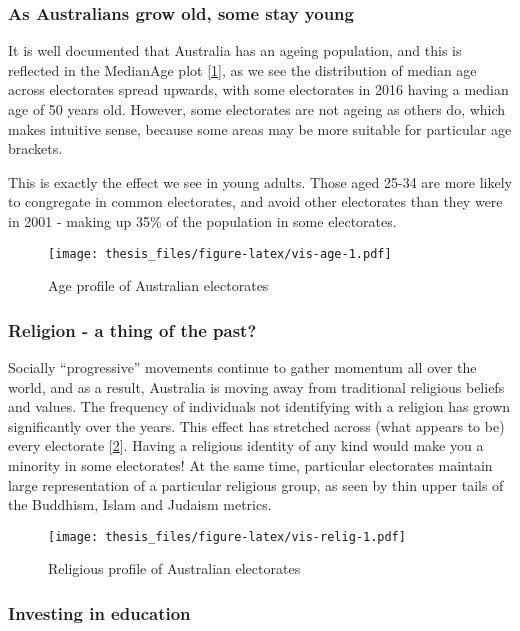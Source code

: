 \documentclass{monashthesis}
\theoremstyle{definition}
\theoremstyle{definition}
\theoremstyle{definition}
\theoremstyle{remark}
\begin{document}
\subsubsection{As Australians grow old, some stay
young}\label{as-australians-grow-old-some-stay-young}

It is well documented that Australia has an ageing population, and this
is reflected in the MedianAge plot {[}\ref{fig:vis-age}{]}, as we see
the distribution of median age across electorates spread upwards, with
some electorates in 2016 having a median age of 50 years old. However,
some electorates are not ageing as others do, which makes intuitive
sense, because some areas may be more suitable for particular age
brackets.

This is exactly the effect we see in young adults. Those aged 25-34 are
more likely to congregate in common electorates, and avoid other
electorates than they were in 2001 - making up 35\% of the population in
some electorates.

\begin{figure}
\centering
\texttt{[image: thesis\_files/figure-latex/vis-age-1.pdf]}
\caption{\label{fig:vis-age}Age profile of Australian electorates}
\end{figure}

\subsubsection{Religion - a thing of the
past?}\label{religion---a-thing-of-the-past}

Socially ``progressive'' movements continue to gather momentum all over
the world, and as a result, Australia is moving away from traditional
religious beliefs and values. The frequency of individuals not
identifying with a religion has grown significantly over the years. This
effect has stretched across (what appears to be) every electorate
{[}\ref{fig:vis-relig}{]}. Having a religious identity of any kind would
make you a minority in some electorates! At the same time, particular
electorates maintain large representation of a particular religious
group, as seen by thin upper tails of the Buddhism, Islam and Judaism
metrics.

\begin{figure}
\centering
\texttt{[image: thesis\_files/figure-latex/vis-relig-1.pdf]}
\caption{\label{fig:vis-relig}Religious profile of Australian electorates}
\end{figure}

\subsubsection{Investing in education}\label{investing-in-education}
\end{document}

